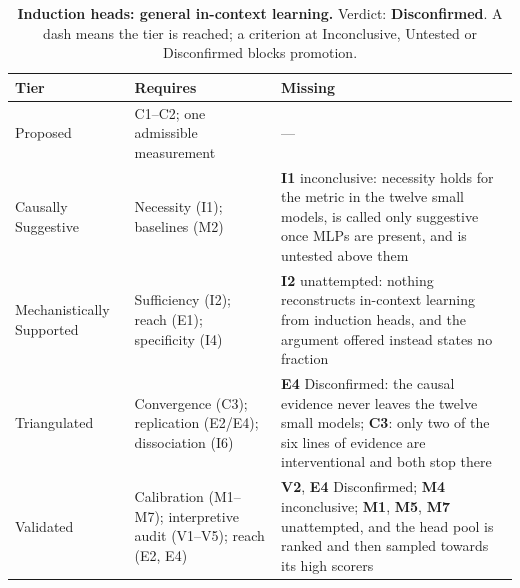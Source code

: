 \begin{table}[H]
\centering
\footnotesize
\caption{\textbf{Induction heads: general in-context learning.} Verdict: \textbf{Disconfirmed}. A dash means the tier is reached; a criterion at
Inconclusive, Untested or Disconfirmed blocks promotion.}
\label{tab:induction_broad-verdict}
\renewcommand{\arraystretch}{1.18}
\begin{tabular}{@{}l>{\raggedright\arraybackslash}p{3.6cm}>{\raggedright\arraybackslash}p{4.4cm}@{}}
\toprule
\textbf{Tier} & \textbf{Requires} & \textbf{Missing} \\
\midrule
Proposed & C1--C2; one admissible measurement & --- \\
\addlinespace[2pt]
Causally Suggestive & Necessity (I1); baselines (M2) & \textbf{I1} inconclusive: necessity holds for the metric in the twelve small models, is called only suggestive once MLPs are present, and is untested above them \\
\addlinespace[2pt]
Mechanistically Supported & Sufficiency (I2); reach (E1); specificity (I4) & \textbf{I2} unattempted: nothing reconstructs in-context learning from induction heads, and the argument offered instead states no fraction \\
\addlinespace[2pt]
Triangulated & Convergence (C3); replication (E2/E4); dissociation (I6) & \textbf{E4} Disconfirmed: the causal evidence never leaves the twelve small models; \textbf{C3}: only two of the six lines of evidence are interventional and both stop there \\
\addlinespace[2pt]
Validated & Calibration (M1--M7); interpretive audit (V1--V5); reach (E2, E4) & \textbf{V2}, \textbf{E4} Disconfirmed; \textbf{M4} inconclusive; \textbf{M1}, \textbf{M5}, \textbf{M7} unattempted, and the head pool is ranked and then sampled towards its high scorers \\
\bottomrule
\end{tabular}
\end{table}
